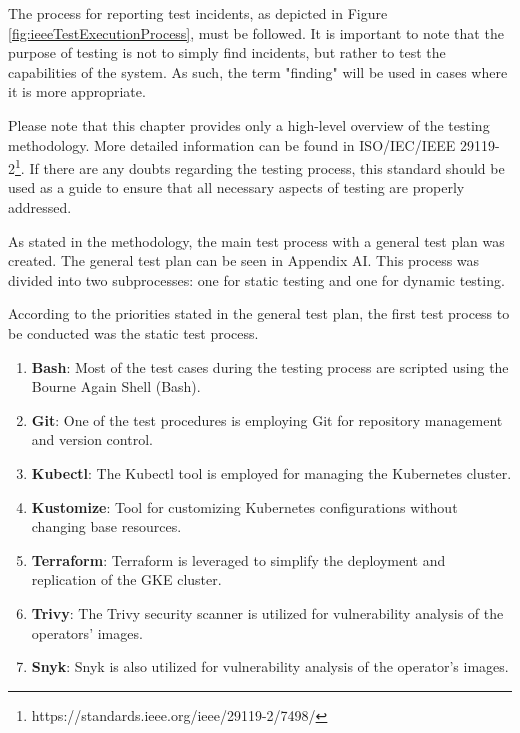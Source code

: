 
The process for reporting test incidents, as depicted in Figure \ref{fig:ieeeTestExecutionProcess}, must be followed. It is important to note that the purpose of testing is not to simply find incidents, but rather to test the capabilities of the system. As such, the term "finding" will be used in cases where it is more appropriate.

Please note that this chapter provides only a high-level overview of the testing methodology. More detailed information can be found in ISO/IEC/IEEE 29119-2\footnote[5]{https://standards.ieee.org/ieee/29119-2/7498/}. If there are any doubts regarding the testing process, this standard should be used as a guide to ensure that all necessary aspects of testing are properly addressed.

\label{chap:testProces}
As stated in the methodology, the main test process with a general test plan was created. The general test plan can be seen in Appendix AI. This process was divided into two subprocesses: one for static testing and one for dynamic testing.

According to the priorities stated in the general test plan, the first test process to be conducted was the static test process.


\begin{enumerate}
    \item \textbf{Bash}: Most of the test cases during the testing process are scripted using the Bourne Again Shell (Bash).
    \item \textbf{Git}: One of the test procedures is employing Git for repository management and version control.
    \item \textbf{Kubectl}: The Kubectl tool is employed for managing the Kubernetes cluster.
    \item \textbf{Kustomize}: Tool for customizing Kubernetes configurations without changing base resources.
    \item \textbf{Terraform}: Terraform is leveraged to simplify the deployment and replication of the GKE cluster.
    \item \textbf{Trivy}: The Trivy security scanner is utilized for vulnerability analysis of the operators' images.
    \item \textbf{Snyk}: Snyk is also utilized for vulnerability analysis of the operator's images.
\end{enumerate}

